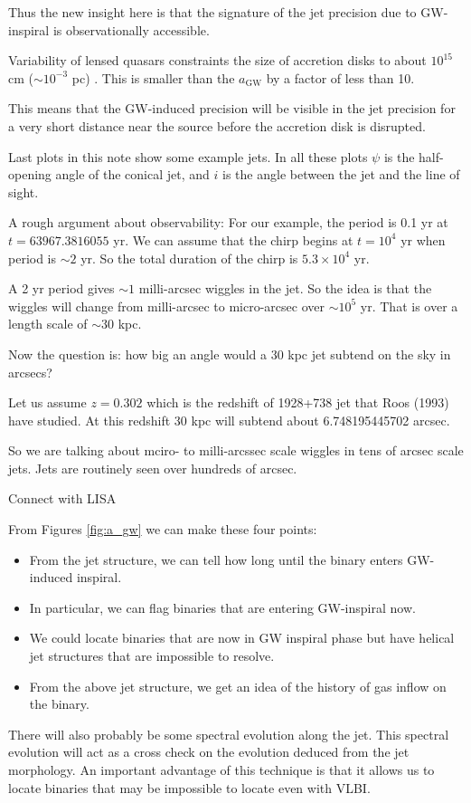 Thus the new insight here is that the signature of the jet precision
due to GW-inspiral is observationally accessible. 

Variability of lensed quasars constraints the size of accretion disks
to about $10^{15}$ cm ($\sim 10^{-3}$ pc) \citep{2010ApJ...712.1129M}.
This is smaller than the $a_\mathrm{GW}$ by a factor of less than 10.

This means that the GW-induced precision will be visible in the jet
precision for a very short distance near the source before the
accretion disk is disrupted.

Last plots in this note show some example jets.  In all these plots
$\psi$ is the half-opening angle of the conical jet, and $i$ is the
angle between the jet and the line of sight.

A rough argument about observability: For our example, the period is
0.1 yr at $t = 63967.3816055$ yr.  We can assume that the chirp begins
at $t = 10^4$ yr when period is $\sim 2$ yr.  So the total duration of
the chirp is $5.3\times 10^4$ yr.

A 2 yr period gives $\sim 1$ milli-arcsec wiggles in the jet.  So the
idea is that the wiggles will change from milli-arcsec to micro-arcsec
over $\sim 10^5$ yr.  That is over a length scale of $\sim 30$ kpc.

Now the question is: how big an angle would a 30 kpc jet subtend on
the sky in arcsecs?

Let us assume $z = 0.302$ which is the redshift of 1928+738 jet that
Roos (1993) have studied.  At this redshift 30 kpc will subtend about
6.748195445702 arcsec.

So we are talking about mciro- to milli-arcssec scale wiggles in tens
of arcsec scale jets.  Jets are routinely seen over hundreds of
arcsec.

Connect with LISA


From Figures \ref{fig:a_gw} we can make these four points:

\begin{itemize}
\item From the jet structure, we can tell how long until the binary enters GW-induced inspiral.
\item In particular, we can flag binaries that are entering GW-inspiral now.
\item We could locate binaries that are now in GW inspiral phase but
  have helical jet structures that are impossible to resolve.
\item From the above jet structure, we get an idea of the history of gas inflow on the binary.
\end{itemize}

There will also probably be some spectral evolution along the jet.
This spectral evolution will act as a cross check on the evolution
deduced from the jet morphology.  An important advantage of this
technique is that it allows us to locate binaries that may be
impossible to locate even with VLBI.

